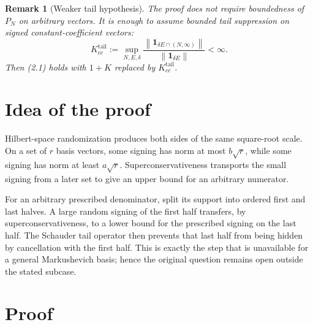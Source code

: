 \documentclass[11pt]{article}
\newtheorem{remark}[theorem]{Remark}
\newcommand{\norm}[1]{\left\lVert #1\right\rVert}
\newcommand{\one}[2]{\mathbf 1_{#1 #2}}
\begin{document}
\begin{remark}[Weaker tail hypothesis]\label{rem:tail}
The proof does not require boundedness of $P_N$ on arbitrary vectors.  It is
enough to assume bounded tail suppression on signed constant-coefficient
vectors:
\[
 K_{cc}^{\mathrm{tail}}
 :=\sup_{N,E,\delta}
 \frac{\norm{\one{\delta}{E\cap(N,\infty)}}}
      {\norm{\one{\delta}{E}}}<\infty.                   \tag{2.2}
\]
Then (2.1) holds with $1+K$ replaced by
$K_{cc}^{\mathrm{tail}}$.
\end{remark}

\section{Idea of the proof}

Hilbert-space randomization produces both sides of the same square-root
scale.  On a set of $r$ basis vectors, some signing has norm at most
$b\sqrt r$, while some signing has norm at least $a\sqrt r$.
Superconservativeness transports the small signing from a later set to give
an upper bound for an arbitrary numerator.

For an arbitrary prescribed denominator, split its support into ordered
first and last halves.  A large random signing of the first half transfers,
by superconservativeness, to a lower bound for the prescribed signing on the
last half.  The Schauder tail operator then prevents that last half from
being hidden by cancellation with the first half.  This is exactly the step
that is unavailable for a general Markushevich basis; hence the original
question remains open outside the stated subcase.

\section{Proof}
\end{document}
